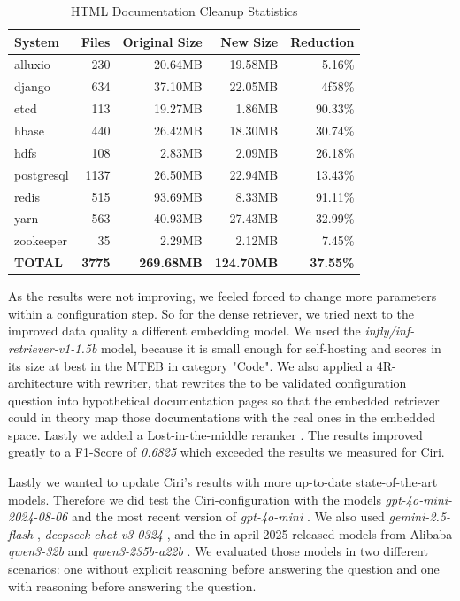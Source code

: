\begin{table}[h]
    \centering
    \begin{tabular}{|l|r|r|r|r|}
        \hline
        \textbf{System} & \textbf{Files} & \textbf{Original Size} & \textbf{New Size} & \textbf{Reduction} \\
        \hline
        alluxio & 230 & 20.64MB & 19.58MB & 5.16\% \\
        django & 634 & 37.10MB & 22.05MB & 4f58\% \\
        etcd & 113 & 19.27MB & 1.86MB & 90.33\% \\
        hbase & 440 & 26.42MB & 18.30MB & 30.74\% \\
        hdfs & 108 & 2.83MB & 2.09MB & 26.18\% \\
        postgresql & 1137 & 26.50MB & 22.94MB & 13.43\% \\
        redis & 515 & 93.69MB & 8.33MB & 91.11\% \\
        yarn & 563 & 40.93MB & 27.43MB & 32.99\% \\
        zookeeper & 35 & 2.29MB & 2.12MB & 7.45\% \\
        \hline
        \textbf{TOTAL} & \textbf{3775} & \textbf{269.68MB} & \textbf{124.70MB} & \textbf{37.55\%} \\
        \hline
    \end{tabular}
    \caption{HTML Documentation Cleanup Statistics}
    \label{tab:cleanup_stats}
\end{table}

As the results were not improving, we feeled forced to change more parameters within a configuration step. So for the dense retriever, we tried next to the improved data quality a different embedding model. We used the \textit{infly/inf-retriever-v1-1.5b} \cite{inflyai2025} model, because it is small enough for self-hosting and scores in its size at best in the MTEB \cite{muennighoff2022mteb} \cite{MTEB} in category "Code". We also applied a 4R-architecture with rewriter, that rewrites the to be validated configuration question into hypothetical documentation pages so that the embedded retriever could in theory map those documentations with the real ones in the embedded space. Lastly we added a Lost-in-the-middle reranker \cite{Liu.06.07.2023}. The results improved greatly to a F1-Score of \textit{0.6825} which exceeded the results we measured for Ciri. 


Lastly we wanted to update Ciri's results with more up-to-date state-of-the-art models. Therefore we did test the Ciri-configuration with the models \textit{gpt-4o-mini-2024-08-06} and the most recent version of \textit{gpt-4o-mini} \cite{OpenAI_2022}. We also used \textit{gemini-2.5-flash} \cite{gemini-2.0}, \textit{deepseek-chat-v3-0324} \cite{deepseekai2024deepseekv3technicalreport}, and the in april 2025 released models from Alibaba \textit{qwen3-32b} and \textit{qwen3-235b-a22b} \cite{qwen3}. We evaluated those models in two different scenarios: one without explicit reasoning before answering the question and one with reasoning before answering the question. 

